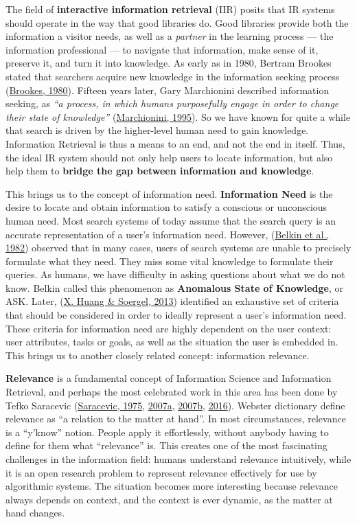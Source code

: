 \documentclass[a4paper, nobind]{templates/ociamthesis}
\begin{document}
The field of \textbf{interactive information retrieval} (IIR) posits that IR
systems should operate in the way that good libraries do. Good libraries
provide both the information a visitor needs, as well as a \emph{partner} in
the learning process --- the information professional --- to navigate
that information, make sense of it, preserve it, and turn it into
knowledge. As early as in 1980, Bertram Brookes stated that searchers
acquire new knowledge in the information seeking process
(\protect\hyperlink{ref-brookes1980foundations}{Brookes, 1980}). Fifteen years later, Gary Marchionini
described information seeking, as \emph{``a process, in which humans
purposefully engage in order to change their state of knowledge''}
(\protect\hyperlink{ref-marchionini1995information}{Marchionini, 1995}). So we have known for quite a while that
search is driven by the higher-level human need to gain knowledge.
Information Retrieval is thus a means to an end, and not the end in
itself. Thus, the ideal IR system should not only help users to locate
information, but also help them to \textbf{bridge the gap between information
and knowledge}.

This brings us to the concept of information need. \textbf{Information Need}
is the desire to locate and obtain information to satisfy a conscious or
unconscious human need. Most search systems of today assume that the
search query is an accurate representation of a user's information need.
However, (\protect\hyperlink{ref-belkin1982ask}{Belkin et al., 1982}) observed that in many cases, users of search
systems are unable to precisely formulate what they need. They miss some
vital knowledge to formulate their queries. As humans, we have
difficulty in asking questions about what we do not know. Belkin called
this phenomenon as \textbf{Anomalous State of Knowledge}, or ASK. Later,
(\protect\hyperlink{ref-huang2013relevance}{X. Huang \& Soergel, 2013}) identified an exhaustive set of criteria that
should be considered in order to ideally represent a user's information
need. These criteria for information need are highly dependent on the
user context: user attributes, tasks or goals, as well as the situation
the user is embedded in. This brings us to another closely related
concept: information relevance.

\textbf{Relevance} is a fundamental concept of Information Science and
Information Retrieval, and perhaps the most celebrated work in this area
has been done by Tefko Saracevic
(\protect\hyperlink{ref-saracevic1975relevance}{Saracevic, 1975}, \protect\hyperlink{ref-saracevic2007relevance}{2007a}, \protect\hyperlink{ref-saracevic2007relevancea}{2007b}, \protect\hyperlink{ref-saracevic2016notion}{2016}).
Webster dictionary define relevance as ``a relation to the matter at
hand''. In most circumstances, relevance is a ``y'know'' notion. People
apply it effortlessly, without anybody having to define for them what
``relevance'' is. This creates one of the most fascinating challenges in
the information field: humans understand relevance intuitively, while it
is an open research problem to represent relevance effectively for use
by algorithmic systems. The situation becomes more interesting because
relevance always depends on context, and the context is ever dynamic, as
the matter at hand changes.
\end{document}
